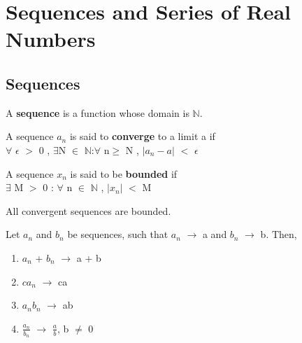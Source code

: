 \documentclass{report}
\begin{document}
\chapter{Sequences and Series of Real Numbers}
\section{Sequences}

\begin{definition}
A \textbf{sequence} is a function whose domain is $\mathbb{N}$.
\end{definition}

\begin{definition}
A sequence $a_n $ is said to \textbf{converge} to a limit a if \\
$\forall$ $\epsilon$ $>$ 0 , $\exists$N $\in$ $\mathbb{N}$:$\forall$ n$\geq$ N , $\lvert a_n - a \rvert$ $<$ $\epsilon$
\end{definition}

\begin{definition}
A sequence $x_n$ is said to be \textbf{bounded} if \\
 $\exists$ M $>$ 0 : $\forall$ n $\in$ $\mathbb{N}$ , $\lvert x_n \rvert$ $<$ M
\end{definition}

\begin{theorem}
All convergent sequences are bounded.
\end{theorem}

\begin{theorem}
Let $a_n$ and $b_n$ be sequences, such that $a_n$ $\rightarrow$ a and $b_n$ $\rightarrow$ b. Then,
\begin{enumerate}
\item $a_n$ + $b_n$ $\rightarrow$ a + b
\item $ca_n$ $\rightarrow$ ca
\item $a_n b_n$ $\rightarrow$ ab
\item $\frac{a_n}{b_n}$ $\rightarrow$ $\frac{a}{b}$, b $\neq$ 0
\end{enumerate}
\end{theorem}
\end{document}

